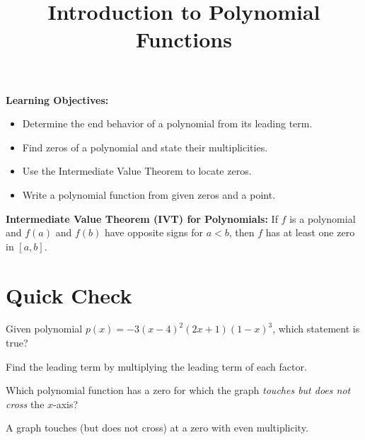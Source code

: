 \documentclass{ximera}
\title{Introduction to Polynomial Functions}
\begin{document}
\begin{abstract}
\end{abstract}
\maketitle

\textbf{Learning Objectives:}
\begin{itemize}
  \item Determine the end behavior of a polynomial from its leading term.
  \item Find zeros of a polynomial and state their multiplicities.
  \item Use the Intermediate Value Theorem to locate zeros.
  \item Write a polynomial function from given zeros and a point.
\end{itemize}
\medskip

\noindent\textbf{Intermediate Value Theorem (IVT) for Polynomials:} If $f$ is a polynomial and $f(a)$ and $f(b)$ have opposite signs for $a<b$, then $f$ has at least one zero in $[a,b]$.

\bigskip
\section*{Quick Check}

\begin{problem}
Given polynomial $p(x) = -3(x-4)^2(2x+1)(1-x)^3$, which statement is true?
\begin{hint}
Find the leading term by multiplying the leading term of each factor.
\end{hint}
\begin{multipleChoice}
\end{multipleChoice}
\end{problem}

\begin{problem}
Which polynomial function has a zero for which the graph \emph{touches but does not cross} the $x$-axis?
\begin{hint}
A graph touches (but does not cross) at a zero with even multiplicity.
\end{hint}
\begin{multipleChoice}
\end{multipleChoice}
\end{problem}
\end{document}
